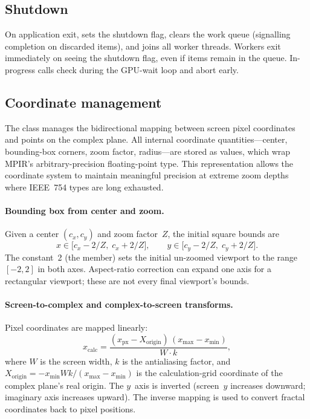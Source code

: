 \subsection{Shutdown}

On application exit,  sets the shutdown flag,
clears the work queue (signalling completion on discarded items), and joins all
worker threads. Workers exit immediately on seeing the shutdown flag, even if
items remain in the queue.  In-progress  calls check
 during the GPU-wait loop and abort early.

\subsection{Coordinate management}
\label{subsec:coordinates}

The  class manages the bidirectional
mapping between screen pixel coordinates and points on the complex
plane.  All internal coordinate quantities---center, bounding-box
corners, zoom factor, radius---are stored as 
values, which wrap MPIR's  arbitrary-precision
floating-point type.  This representation allows the coordinate system to maintain
meaningful precision at extreme zoom depths where IEEE~754 types are
long exhausted.

\paragraph{Bounding box from center and zoom.}
Given a center $(c_x, c_y)$ and zoom factor~$Z$, the initial square bounds are
\[
  x \in \bigl[c_x - 2/Z,\; c_x + 2/Z\bigr],\qquad
  y \in \bigl[c_y - 2/Z,\; c_y + 2/Z\bigr].
\]
The constant~2 (the  member) sets the initial
un-zoomed viewport to the range $[-2,2]$ in both axes. Aspect-ratio correction can
expand one axis for a rectangular viewport; these are not every final viewport's
bounds.

\paragraph{Screen-to-complex and complex-to-screen transforms.}
Pixel coordinates are mapped linearly:
\[
  x_{\text{calc}} = \frac{(x_{\text{px}} - X_{\mathrm{origin}})\,(x_{\max}-x_{\min})}
                         {W \cdot k},
\]
where $W$ is the screen width, $k$ is the antialiasing factor, and
$X_{\mathrm{origin}}=-x_{\min}Wk/(x_{\max}-x_{\min})$ is the calculation-grid
coordinate of the complex plane's real origin.
The $y$~axis is inverted (screen~$y$ increases downward; imaginary
axis increases upward).  The inverse mapping is used to convert
fractal coordinates back to pixel positions.

